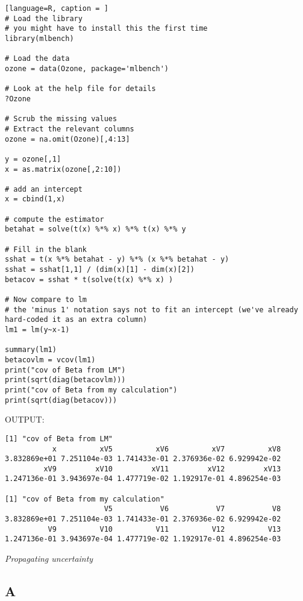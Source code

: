\documentclass{article}
\begin{document}
\begin{lstlisting}[language=R, caption = ]
# Load the library
# you might have to install this the first time
library(mlbench)

# Load the data
ozone = data(Ozone, package='mlbench')

# Look at the help file for details
?Ozone

# Scrub the missing values
# Extract the relevant columns 
ozone = na.omit(Ozone)[,4:13]

y = ozone[,1]
x = as.matrix(ozone[,2:10])

# add an intercept
x = cbind(1,x)

# compute the estimator
betahat = solve(t(x) %*% x) %*% t(x) %*% y

# Fill in the blank
sshat = t(x %*% betahat - y) %*% (x %*% betahat - y)
sshat = sshat[1,1] / (dim(x)[1] - dim(x)[2])
betacov = sshat * t(solve(t(x) %*% x) )

# Now compare to lm
# the 'minus 1' notation says not to fit an intercept (we've already hard-coded it as an extra column)
lm1 = lm(y~x-1)

summary(lm1)
betacovlm = vcov(lm1)
print("cov of Beta from LM")
print(sqrt(diag(betacovlm)))
print("cov of Beta from my calculation")
print(sqrt(diag(betacov)))

\end{lstlisting}

\noindent
OUTPUT:

\begin{verbatim}
[1] "cov of Beta from LM"
           x          xV5          xV6          xV7          xV8 
3.832869e+01 7.251104e-03 1.741433e-01 2.376936e-02 6.929942e-02 
         xV9         xV10         xV11         xV12         xV13 
1.247136e-01 3.943697e-04 1.477719e-02 1.192917e-01 4.896254e-03 

[1] "cov of Beta from my calculation"
                       V5           V6           V7           V8 
3.832869e+01 7.251104e-03 1.741433e-01 2.376936e-02 6.929942e-02 
          V9          V10          V11          V12          V13 
1.247136e-01 3.943697e-04 1.477719e-02 1.192917e-01 4.896254e-03 
\end{verbatim}




\textit{Propagating uncertainty}
\subsection*{A}
\end{document}
